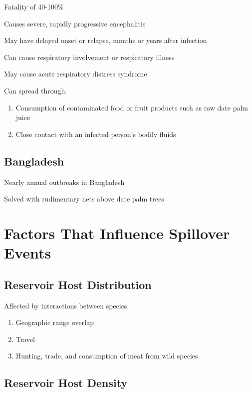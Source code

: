 \documentclass{notes}
\begin{document}
Fatality of 40-100\%

Causes severe, rapidly progressive encephalitis

\tab \indicates May have delayed onset or relapse, months or years after infection

Can cause respiratory involvement or respiratory illness

\tab \indicates May cause acute respiratory distress syndrome

Can spread through:

\begin{enumerate}
    \item Consumption of contaminated food or fruit products such as raw date palm juice
    \item Close contact with an infected person's bodily fluids
\end{enumerate}

\subsection{Bangladesh}

Nearly annual outbreaks in Bangladesh

Solved with rudimentary nets above date palm trees


\section{Factors That Influence Spillover Events}

\subsection{Reservoir Host Distribution}

Affected by interactions between species:

\begin{enumerate}
    \item Geographic range overlap
    \item Travel
    \item Hunting, trade, and consumption of meat from wild species
\end{enumerate}

\subsection{Reservoir Host Density}
\end{document}

